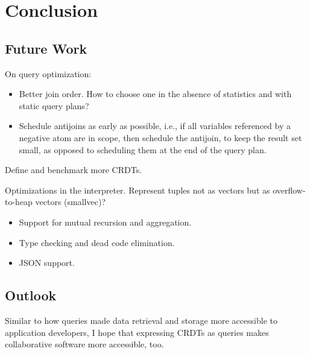 
\chapter{Conclusion}\label{ch:conclusion}

\section{Future Work}\label{sec:future-work}

On query optimization:
\begin{itemize}
	\item Better join order. How to choose one in the absence of statistics
	      and with static query plans?
	\item Schedule antijoins as early as possible, i.e., if all variables
	      referenced by a negative atom are in scope, then schedule the antijoin,
	      to keep the result set small, as opposed to scheduling them at the
	      end of the query plan.
\end{itemize}

Define and benchmark more CRDTs.

Optimizations in the interpreter. Represent tuples not as vectors but
as overflow-to-heap vectors (smallvec)?

\begin{itemize}
	\item Support for mutual recursion and aggregation.
	\item Type checking and dead code elimination.
	\item JSON support.
\end{itemize}

\section{Outlook}\label{sec:outlook}

Similar to how queries made data retrieval and storage more accessible to
application developers, I hope that expressing \acp{CRDT} as queries
makes collaborative software more accessible, too.
